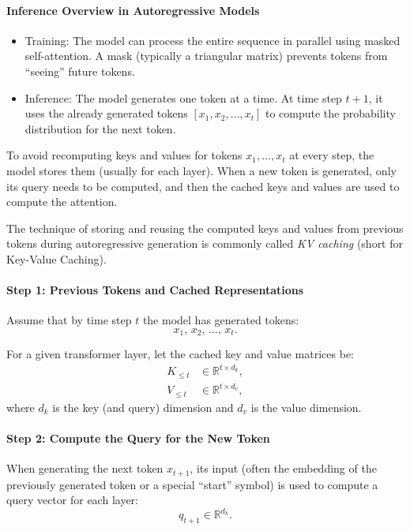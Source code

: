 \paragraph{Inference Overview in Autoregressive Models}
\begin{itemize}
	\item Training: The model can process the entire sequence in parallel using masked self-attention. A mask (typically a triangular matrix) prevents tokens from ``seeing'' future tokens.
	\item Inference: The model generates one token at a time. At time step \( t+1 \), it uses the already generated tokens \( [x_1, x_2, \dots, x_t] \) to compute the probability distribution for the next token.
\end{itemize}

To avoid recomputing keys and values for tokens \( x_1, \dots, x_t \) at every step, the model stores them (usually for each layer). When a new token is generated, only its query needs to be computed, and then the cached keys and values are used to compute the attention.

The technique of storing and reusing the computed keys and values from previous tokens during autoregressive generation is commonly called \textit{KV caching} (short for Key-Value Caching).

\paragraph{Step 1: Previous Tokens and Cached Representations}

Assume that by time step \( t \) the model has generated tokens:
\[
x_1,\, x_2,\, \dots,\, x_t.
\]

For a given transformer layer, let the cached key and value matrices be:
\[
\begin{aligned}
K_{\leq t} &\in \mathbb{R}^{t \times d_k}, \\
V_{\leq t} &\in \mathbb{R}^{t \times d_v},
\end{aligned}
\]
where \( d_k \) is the key (and query) dimension and \( d_v \) is the value dimension.

\paragraph{Step 2: Compute the Query for the New Token}

When generating the next token \( x_{t+1} \), its input (often the embedding of the previously generated token or a special “start” symbol) is used to compute a query vector for each layer:
\[
q_{t+1} \in \mathbb{R}^{d_k}.
\]

